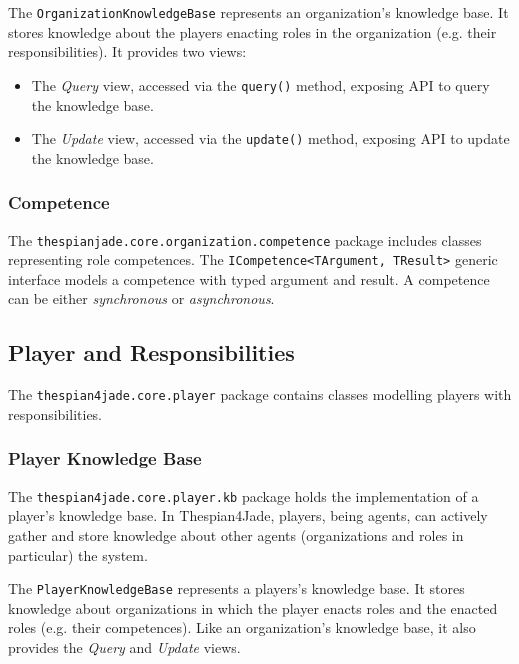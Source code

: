 The \texttt{OrganizationKnowledgeBase} represents an organization's knowledge base.
It stores knowledge about the players enacting roles in the organization (e.g. their responsibilities).
It provides two views:
\begin{itemize}
	\item The \textit{Query} view, accessed via the \texttt{query()} method, exposing API to query the knowledge base.
	\item The \textit{Update} view, accessed via the \texttt{update()} method, exposing API to update the knowledge base.
\end{itemize}

\subsubsection{Competence}

The \texttt{thespianjade.core.organization.competence} package includes classes representing role competences.
The \texttt{ICompetence<TArgument, TResult>} generic interface models a competence with typed argument and result.
A competence can be either \textit{synchronous} or \textit{asynchronous}.


\subsection{Player and Responsibilities}

The \texttt{thespian4jade.core.player} package contains classes modelling players with responsibilities.


\subsubsection{Player Knowledge Base}

The \texttt{thespian4jade.core.player.kb} package holds the implementation of a player's knowledge base.
In Thespian4Jade, players, being agents, can actively gather and store knowledge about other agents (organizations and roles in particular) the system.

The \texttt{PlayerKnowledgeBase} represents a players's knowledge base.
It stores knowledge about organizations in which the player enacts roles and the enacted roles (e.g. their competences).
Like an organization's knowledge base, it also provides the \textit{Query} and \textit{Update} views.

